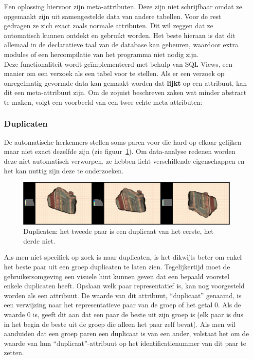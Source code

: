 Een oplossing hiervoor zijn meta-attributen. Deze zijn niet schrijfbaar omdat ze opgemaakt zijn uit samengestelde data van andere tabellen. Voor de rest gedragen ze zich exact zoals normale attributen. Dit wil zeggen dat ze automatisch kunnen ontdekt en gebruikt worden. Het beste hieraan is dat dit allemaal in de declaratieve taal van de database kan gebeuren, waardoor extra modules of een hercompilatie van het programma niet nodig zijn.\\

Deze functionaliteit wordt ge\"implementeerd met behulp van SQL Views, een manier om een verzoek als een tabel voor te stellen. Als er een verzoek op onregelmatig gevormde data kan gemaakt worden dat \textbf{lijkt} op een attribuut, kan dit een meta-attribuut zijn. Om de zojuist beschreven zaken wat minder abstract te maken, volgt een voorbeeld van een twee echte meta-attributen:\\

\subsubsection{Duplicaten}
De automatische herkenners stellen soms paren voor die hard op elkaar gelijken maar niet exact dezelfde zijn (zie figuur~\ref{fig:duplicates}). Om data-analyse redenen worden deze niet automatisch verworpen, ze hebben licht verschillende eigenschappen en het kan nuttig zijn deze te onderzoeken.\\

\begin{figure}[ht]
	\begin{center}
		\includegraphics[width=1.0\columnwidth]{images/duplicates.png}
		\caption{Duplicaten: het tweede paar is een duplicaat van het eerste, het derde niet.}
		\label{fig:duplicates}
	\end{center}
\end{figure}

Als men niet specifiek op zoek is naar duplicaten, is het dikwijls beter om enkel het beste paar uit een groep duplicaten te laten zien. Tegelijkertijd moet de gebruikersomgeving een visuele hint kunnen geven dat een bepaald voorstel enkele duplicaten heeft. Opslaan welk paar representatief is, kan nog voorgesteld worden als een attribuut. De waarde van dit attribuut, ``duplicaat'' genaamd, is een verwijzing naar het representatieve paar van de groep of het getal 0. Als de waarde 0 is, geeft dit aan dat een paar de beste uit zijn groep is (elk paar is dus in het begin de beste uit de groep die alleen het paar zelf bevat). Als men wil aanduiden dat een groep paren een duplicaat is van een ander, volstaat het om de waarde van hun ``duplicaat''-attribuut op het identificatienummer van dit paar te zetten.\\


